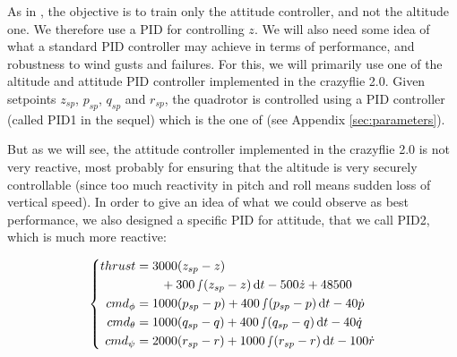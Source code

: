 \documentclass[anonymous=true,format=sigconf, screen=true, review=false]{acmart}
\begin{document}
As in \cite{rl}, the objective is to train only the attitude controller, and not the altitude one. We therefore use a PID for controlling $z$. We will also need some idea of what a standard PID controller may achieve in terms of performance, and robustness to wind gusts and failures. For this, we will primarily use one of the altitude and attitude PID controller implemented in the crazyflie 2.0. 
Given setpoints $z_{sp}$, $p_{sp}$, $q_{sp}$ and $r_{sp}$, the quadrotor is controlled using a PID controller (called PID1 in the sequel) which is the one of \cite{goubault_putot} (see Appendix \ref{sec:parameters}). 

But as we will see, the attitude controller implemented in the crazyflie 2.0 is not very reactive, most probably for ensuring that the altitude is very securely controllable (since too much reactivity in pitch and roll means sudden loss of vertical speed). In order to give an idea of what we could observe as best performance, we 
also designed a specific PID for attitude, that we call PID2, which is much more reactive:  %


\begin{equation}
\label{eq:control2}
\left\{
\begin{aligned}
thrust &= 3000(z_{sp} - z) \\ & \qquad + 300 \smallint (z_{sp} - z) \,\mathrm{d}t - 500 \dot{z} + 48500 \\
cmd_{\phi} &= 1000 (p_{sp} - p) +  400 \smallint (p_{sp} - p) \,\mathrm{d}t - 40 \dot{p} \\
cmd_{\theta} &= 1000 (q_{sp} - q) +  400 \smallint (q_{sp} - q) \,\mathrm{d}t - 40 \dot{q}\\
cmd_{\psi} &= 2000 (r_{sp} - r) + 1000 \smallint (r_{sp} - r) \,\mathrm{d}t - 100 \dot{r}
\end{aligned}
\right.
\end{equation}
\end{document}
